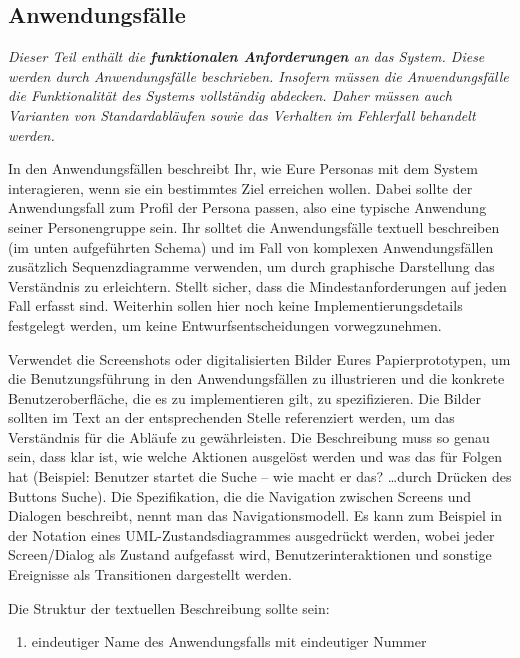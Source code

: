 \documentclass[fontsize=12pt,paper=a4,twoside]{scrartcl}
\begin{document}
\subsection{Anwendungsfälle}
  {\em Dieser Teil enthält die \textbf{funktionalen Anforderungen} an
  das System. Diese werden durch Anwendungsfälle beschrieben. Insofern
  müssen die Anwendungsfälle die Funktionalität des Systems
  vollständig abdecken. Daher müssen auch Varianten von
  Standard\-ab\-läufen sowie das Verhalten im Fehlerfall behandelt werden.
  
  In den Anwendungsfällen beschreibt Ihr, wie Eure Personas mit dem
  System interagieren, wenn sie ein bestimmtes Ziel erreichen wollen.
  Dabei sollte der Anwendungsfall zum Profil der Persona passen, also
  eine typische Anwendung seiner Personengruppe sein. Ihr solltet die
  Anwendungsfälle textuell beschreiben (im unten aufgeführten Schema)
  und im Fall von komplexen Anwendungsfällen zusätzlich
  Sequenzdiagramme verwenden, um durch graphische Darstellung das
  Verständnis zu erleichtern.  Stellt sicher, dass die
  Mindestanforderungen auf jeden Fall erfasst sind.  Weiterhin sollen
  hier noch keine Implementierungsdetails festgelegt werden, um keine
  Entwurfsentscheidungen vorwegzunehmen.

  Verwendet die Screenshots oder digitalisierten Bilder Eures
  Papierprototypen, um die Benutzungsführung in den Anwendungsfällen
  zu illustrieren und die konkrete Benutzer\-oberfläche, die es zu
  implementieren gilt, zu spezifizieren. Die Bilder sollten im Text an
  der entsprechenden Stelle referenziert werden, um das Verständnis
  für die Abläufe zu gewährleisten. Die Beschreibung muss so genau
  sein, dass klar ist, wie welche Aktionen ausgelöst werden und was
  das für Folgen hat (Beispiel: {\glqq}Benutzer startet die
  Suche{\grqq} -- wie macht er das?  {\glqq}{\ldots}durch Drücken des
  Buttons {\glq}Suche{\grq}{\grqq}). Die Spezifikation, die die
  Navigation zwischen Screens und Dialogen beschreibt, nennt man
  das Navigationsmodell. Es kann zum Beispiel in der Notation eines   
  UML-Zustandsdiagrammes ausgedrückt werden, wobei jeder Screen/Dialog als
  Zustand aufgefasst wird, Benutzerinteraktionen und sonstige Ereignisse
  als Transitionen dargestellt werden.

  Die Struktur der textuellen Beschreibung sollte sein:
  \begin{enumerate}
    \item eindeutiger Name des Anwendungsfalls mit eindeutiger Nummer
    

\end{enumerate}}
\end{document}
